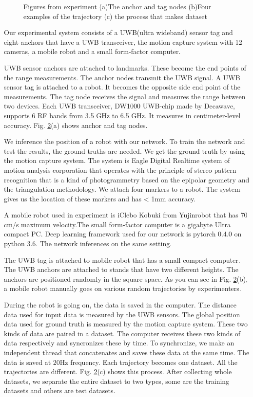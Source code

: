\documentclass{ieeeaccess}
\begin{document}
\begin{figure}[h]
\begin{subfigure}[b]{.5\textwidth}
		\label{fig:trajectories} 	
		\caption{}
	\end{subfigure}
	\caption{Figures from experiment (a)The anchor and tag nodes (b)Four examples of the trajectory (c) the process that makes dataset}
	\label{fig:experiment}
\end{figure}
Our experimental system consists of a UWB(ultra wideband) sensor tag and eight anchors that have a UWB transceiver, the motion capture system with 12 cameras, a mobile robot and a small form-factor computer.

UWB sensor anchors are attached to landmarks. These become the end points of the range measurements. The anchor nodes transmit the UWB signal. A UWB sensor tag is attached to a robot. It becomes the opposite side end point of the measurements. The tag node receives the signal and measures the range between two devices. Each UWB transceiver, DW1000 UWB-chip made by Decawave, supports 6 RF bands from 3.5 GHz to 6.5 GHz. It measures in centimeter-level accuracy. Fig. \ref{fig:experiment}(a) shows anchor and tag nodes.

We inference the position of a robot with our network. To train the network and test the results, the ground truths are needed. We get the ground truth by using the motion capture system. The system is Eagle Digital Realtime system of motion analysis corporation that operates with the principle of stereo pattern recognition that is a kind of photogrammetry based on the epipolar geometry and the triangulation methodology. We attach four markers to a robot. The system gives us the location of these markers and has < 1mm accuracy.

A mobile robot used in experiment is iClebo Kobuki from Yujinrobot that has 70 cm/s maximum velocity.The small form-factor computer is a gigabyte Ultra compact PC. Deep learning framework used for our network is pytorch 0.4.0 on python 3.6. The network inferences on the same setting.

The UWB tag is attached to mobile robot that has a small compact computer. The UWB anchors are attached to stands that have two different heights. The anchors are positioned randomly in the square space. As you can see in Fig. \ref{fig:experiment}(b), a mobile robot manually goes on various random trajectories by experimenters.

During the robot is going on, the data is saved in the computer. The distance data used for input data is measured by the UWB sensors. The global position data used for ground truth is measured by the motion capture system. These two kinds of data are paired in a dataset. The computer receives these two kinds of data respectively and syncronizes these by time. To synchronize, we make an independent thread that concatenates and saves these data at the same time. The data is saved at 20Hz frequency. Each trajectory becomes one dataset. All the trajectories are different. Fig. \ref{fig:experiment}(c) shows this process. After collecting whole datasets, we separate the entire dataset to two types, some are the training datasets and others are test datasets.
\end{document}
